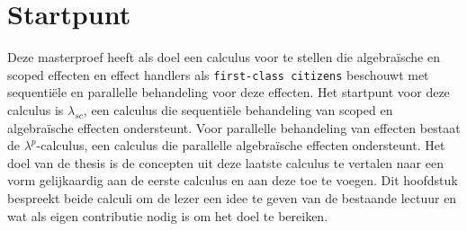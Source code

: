 \chapter{Startpunt}\label{hoofdstuk:startpunt}
Deze masterproef heeft als doel een calculus voor te stellen die algebraïsche en scoped effecten en effect handlers als \texttt{first-class citizens} beschouwt met sequentiële en parallelle behandeling voor deze effecten. Het startpunt voor deze calculus is $\lambda_{sc}$\cite{Bosman2022}, een calculus die sequentiële behandeling van scoped en algebraïsche effecten ondersteunt. Voor parallelle behandeling van effecten bestaat de $\lambda^{p}$-calculus\cite{Xie2021}, een calculus die parallelle algebraïsche effecten ondersteunt. Het doel van de thesis is de concepten uit deze laatste calculus te vertalen naar een vorm gelijkaardig aan de eerste calculus en aan deze toe te voegen. Dit hoofdstuk bespreekt beide calculi om de lezer een idee te geven van de bestaande lectuur en wat als eigen contributie nodig is om het doel te bereiken.

